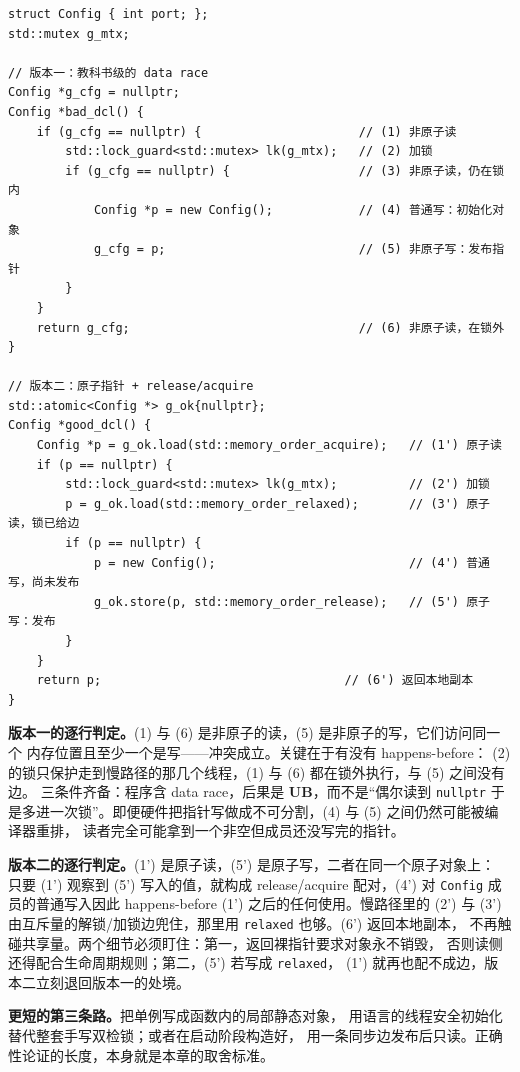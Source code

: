 \documentclass[12pt,a4paper,fontset=fandol]{ctexbook}
\newcommand{\Tp}[1]{\texttt{#1}}
\newcommand{\UB}{\textbf{\textsf{UB}}}
\begin{document}
\begin{casebox}[title={双检锁：裸指针版本与原子版本}]
\begin{lstlisting}[style=cppstyle, caption={两个版本：(1) 竞态版，(2) 正确版}]
struct Config { int port; };
std::mutex g_mtx;

// 版本一：教科书级的 data race
Config *g_cfg = nullptr;
Config *bad_dcl() {
    if (g_cfg == nullptr) {                      // (1) 非原子读
        std::lock_guard<std::mutex> lk(g_mtx);   // (2) 加锁
        if (g_cfg == nullptr) {                  // (3) 非原子读，仍在锁内
            Config *p = new Config();            // (4) 普通写：初始化对象
            g_cfg = p;                           // (5) 非原子写：发布指针
        }
    }
    return g_cfg;                                // (6) 非原子读，在锁外
}

// 版本二：原子指针 + release/acquire
std::atomic<Config *> g_ok{nullptr};
Config *good_dcl() {
    Config *p = g_ok.load(std::memory_order_acquire);   // (1') 原子读
    if (p == nullptr) {
        std::lock_guard<std::mutex> lk(g_mtx);          // (2') 加锁
        p = g_ok.load(std::memory_order_relaxed);       // (3') 原子读，锁已给边
        if (p == nullptr) {
            p = new Config();                           // (4') 普通写，尚未发布
            g_ok.store(p, std::memory_order_release);   // (5') 原子写：发布
        }
    }
    return p;                                  // (6') 返回本地副本
}
\end{lstlisting}

\textbf{版本一的逐行判定。}(1) 与 (6) 是非原子的读，(5) 是非原子的写，它们访问同一个
内存位置且至少一个是写——冲突成立。关键在于有没有 happens-before：
(2) 的锁只保护走到慢路径的那几个线程，(1) 与 (6) 都在锁外执行，与 (5) 之间没有边。
三条件齐备：程序含 data race，后果是 \UB{}，而不是“偶尔读到 \Tp{nullptr}
于是多进一次锁”。即便硬件把指针写做成不可分割，(4) 与 (5) 之间仍然可能被编译器重排，
读者完全可能拿到一个非空但成员还没写完的指针。

\textbf{版本二的逐行判定。}(1') 是原子读，(5') 是原子写，二者在同一个原子对象上：
只要 (1') 观察到 (5') 写入的值，就构成 release/acquire 配对，(4') 对 \Tp{Config}
成员的普通写入因此 happens-before (1') 之后的任何使用。慢路径里的 (2') 与 (3')
由互斥量的解锁/加锁边兜住，那里用 \Tp{relaxed} 也够。(6') 返回本地副本，
不再触碰共享量。两个细节必须盯住：第一，返回裸指针要求对象永不销毁，
否则读侧还得配合生命周期规则；第二，(5') 若写成 \Tp{relaxed}，
(1') 就再也配不成边，版本二立刻退回版本一的处境。

\textbf{更短的第三条路。}把单例写成函数内的局部静态对象，
用语言的线程安全初始化替代整套手写双检锁；或者在启动阶段构造好，
用一条同步边发布后只读。正确性论证的长度，本身就是本章的取舍标准。
\end{casebox}
\end{document}

